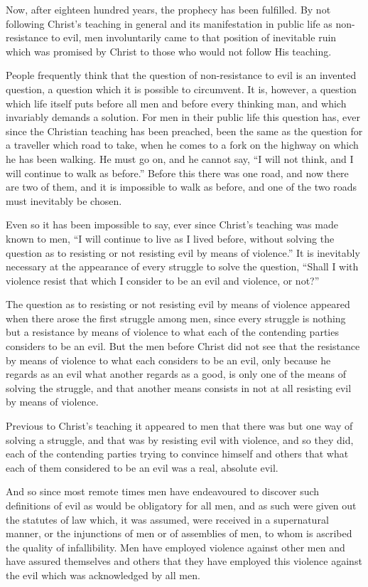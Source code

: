 \documentclass{book}
\begin{document}
Now, after eighteen hundred years, the prophecy has been fulfilled. By not following Christ’s teaching in general and its manifestation in public life as non-resistance to evil, men involuntarily came to that position of inevitable ruin which was promised by Christ to those who would not follow His teaching.

People frequently think that the question of non-resistance to evil is an invented question, a question which it is possible to circumvent. It is, however, a question which life itself puts before all men and before every thinking man, and which invariably demands a solution. For men in their public life this question has, ever since the Christian teaching has been preached, been the same as the question for a traveller which road to take, when he comes to a fork on the highway on which he has been walking. He must go on, and he cannot say, “I will not think, and I will continue to walk as before.” Before this there was one road, and now there are two of them, and it is impossible to walk as before, and one of the two roads must inevitably be chosen.

Even so it has been impossible to say, ever since Christ’s teaching was made known to men, “I will continue to live as I lived before, without solving the question as to resisting or not resisting evil by means of violence.” It is inevitably necessary at the appearance of every struggle to solve the question, “Shall I with violence resist that which I consider to be an evil and violence, or not?”

The question as to resisting or not resisting evil by means of violence appeared when there arose the first struggle among men, since every struggle is nothing but a resistance by means of violence to what each of the contending parties considers to be an evil. But the men before Christ did not see that the resistance by means of violence to what each considers to be an evil, only because he regards as an evil what another regards as a good, is only one of the means of solving the struggle, and that another means consists in not at all resisting evil by means of violence.

Previous to Christ’s teaching it appeared to men that there was but one way of solving a struggle, and that was by resisting evil with violence, and so they did, each of the contending parties trying to convince himself and others that what each of them considered to be an evil was a real, absolute evil.

And so since most remote times men have endeavoured to discover such definitions of evil as would be obligatory for all men, and as such were given out the statutes of law which, it was assumed, were received in a supernatural manner, or the injunctions of men or of assemblies of men, to whom is ascribed the quality of infallibility. Men have employed violence against other men and have assured themselves and others that they have employed this violence against the evil which was acknowledged by all men.
\end{document}
